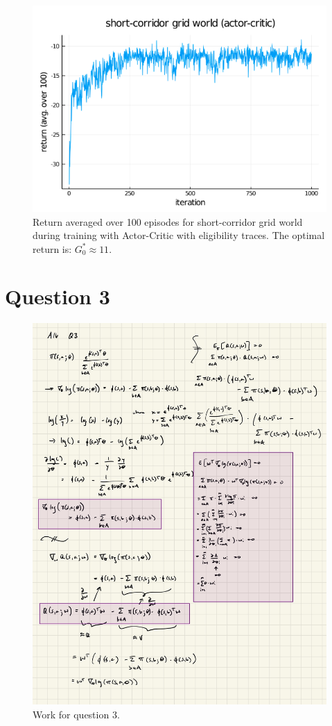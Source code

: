 \documentclass[12pt]{article}
\begin{document}
\begin{figure}[H]
	\centering
	\includegraphics[width=.75\textwidth]{figures/sc_gw_ac.png}
	\caption{Return averaged over 100 episodes for short-corridor grid world during training with Actor-Critic with eligibility traces. The optimal return is: $G_0^* \approx 11$.}
	\label{}
\end{figure}

\section{Question 3}

\begin{figure}[H]
	\centering
	\includegraphics[width=.75\textwidth]{ipad/q3.jpg}
	\caption{Work for question 3.}
	\label{}
\end{figure}
\end{document}

